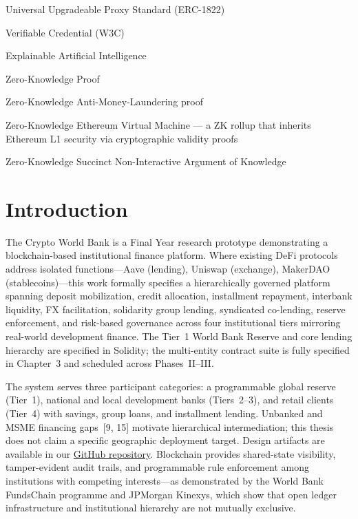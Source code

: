 \documentclass[12pt, a4paper]{report}
\begin{document}
\begin{description}[leftmargin=0pt]
    \item[UUPS:] Universal Upgradeable Proxy Standard (ERC-1822)
    \item[VC:] Verifiable Credential (W3C)
    \item[XAI:] Explainable Artificial Intelligence
    \item[ZKP:] Zero-Knowledge Proof
    \item[zkAML:] Zero-Knowledge Anti-Money-Laundering proof
    \item[zkEVM:] Zero-Knowledge Ethereum Virtual Machine --- a ZK rollup that inherits Ethereum L1 security via cryptographic validity proofs
    \item[zk-SNARK:] Zero-Knowledge Succinct Non-Interactive Argument of Knowledge
\end{description}
\newpage
{}
\setcounter{page}{1}

\chapter{Introduction}
\label{sec:intro}

The Crypto World Bank is a Final Year research prototype demonstrating a blockchain-based institutional finance platform. Where existing DeFi protocols address isolated functions---Aave (lending), Uniswap (exchange), MakerDAO (stablecoins)---this work formally specifies a hierarchically governed platform spanning deposit mobilization, credit allocation, installment repayment, interbank liquidity, FX facilitation, solidarity group lending, syndicated co-lending, reserve enforcement, and risk-based governance across four institutional tiers mirroring real-world development finance. The Tier~1 World Bank Reserve and core lending hierarchy are specified in Solidity; the multi-entity contract suite is fully specified in Chapter~3 and scheduled across Phases~II--III.

The system serves three participant categories: a programmable global reserve (Tier~1), national and local development banks (Tiers~2--3), and retail clients (Tier~4) with savings, group loans, and installment lending. Unbanked and MSME financing gaps~[9, 15] motivate hierarchical intermediation; this thesis does not claim a specific geographic deployment target. Design artifacts are available in our \href{https://github.com/Yuvraajrahman/Cryto-World-Bank}{GitHub repository}. Blockchain provides shared-state visibility, tamper-evident audit trails, and programmable rule enforcement among institutions with competing interests---as demonstrated by the World Bank FundsChain programme and JPMorgan Kinexys, which show that open ledger infrastructure and institutional hierarchy are not mutually exclusive.
\end{document}

